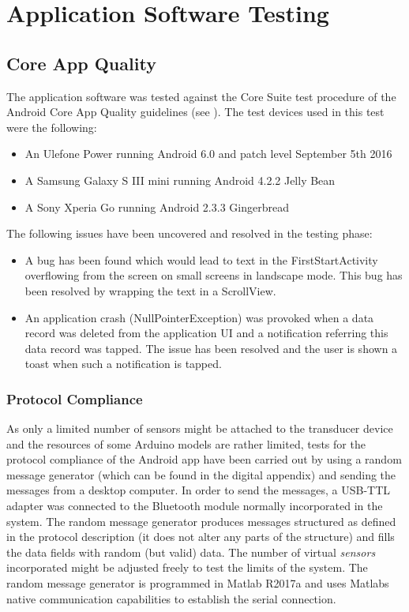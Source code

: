 \section{Application Software Testing}
\subsection{Core App Quality}
The application software was tested against the Core Suite test procedure of the Android Core App Quality guidelines (see \cite{CoreAppQ}). The test devices used in this test were the following:
\begin{itemize}
	\item An Ulefone Power running Android 6.0 and patch level September 5th 2016
	\item A Samsung Galaxy S III mini running Android 4.2.2 Jelly Bean
	\item A Sony Xperia Go running Android 2.3.3 Gingerbread
\end{itemize}

The following issues have been uncovered and resolved in the testing phase:
\begin{itemize}
\item A bug has been found which would lead to text in the FirstStartActivity overflowing from the screen on small screens in landscape mode. This bug has been resolved by wrapping the text in a ScrollView.
\item An application crash (NullPointerException) was provoked when a data record was deleted from the application UI and a notification referring this data record was tapped. The issue has been resolved and the user is shown a toast when such a notification is tapped.
\end{itemize}

\subsubsection{Protocol Compliance}
As only a limited number of sensors might be attached to the transducer device and the resources of some Arduino models are rather limited, tests for the protocol compliance of the Android app have been carried out by using a random message generator (which can be found in the digital appendix) and sending the messages from a desktop computer. In order to send the messages, a USB-TTL adapter was connected to the Bluetooth module normally incorporated in the system. The random message generator produces messages structured as defined in the protocol description (it does not alter any parts of the structure) and fills the data fields with random (but valid) data. The number of virtual \emph{sensors} incorporated might be adjusted freely to test the limits of the system. The random message generator is programmed in Matlab R2017a and uses Matlabs native communication capabilities to establish the serial connection.

